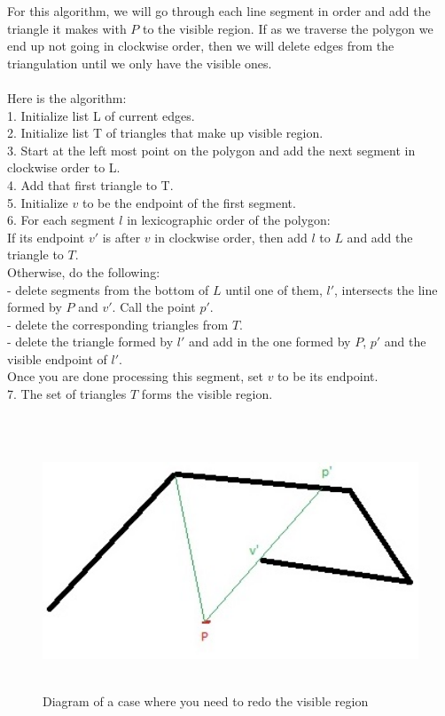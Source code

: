 \documentclass[11pt,psfig]{article}
\begin{document}
For this algorithm, we will go through each line segment in order and add the triangle it makes with $P$ to the visible region. If as we traverse the polygon we end up not going in clockwise order, then we will delete edges from the triangulation until we only have the visible ones. \\
\\
Here is the algorithm:\\
1. Initialize list L of current edges. \\
2. Initialize list T of triangles that make up visible region. \\
3. Start at the left most point on the polygon and add the next segment in clockwise order to L. \\
4. Add that first triangle to T. \\
5. Initialize $v$ to be the endpoint of the first segment. \\
6. For each segment $l$ in lexicographic order of the polygon:\\
If its endpoint $v'$ is after $v$ in clockwise order, then add $l$ to $L$ and add the triangle to $T$. \\
Otherwise, do the following: \\
- delete segments from the bottom of $L$ until one of them, $l'$, intersects the line formed by $P$ and $v'$. Call the point $p'$. \\
- delete the corresponding triangles from $T$. \\
- delete the triangle formed by $l'$ and add in the one formed by $P$, $p'$ and the visible endpoint of $l'$. \\
Once you are done processing this segment, set $v$ to be its endpoint. \\
7. The set of triangles $T$ forms the visible region. \\
\\

\begin{figure}[H]
\centering
\includegraphics[height=3in]{reordering_case.jpg}
\caption{Diagram of a case where you need to redo the visible region}
\end{figure}
\end{document}
